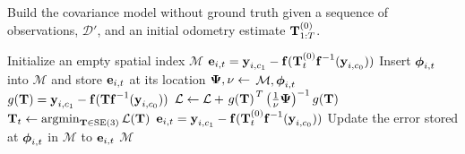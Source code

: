 \begin{algorithm}
  \caption{Build the covariance model without ground truth given a sequence of observations, $\mathcal{D'}$, and an initial odometry estimate $\boldsymbol{\mathbf{T}}_{1:T}^{(0)}$.}
  \label{alg:train-em}
  \begin{algorithmic}
      \State Initialize an empty spatial index $\mathcal{M}$
          \State $\boldsymbol{\mathbf{e}}_{i,t} = \boldsymbol{\mathbf{y}}_{i, c_1} -
          \boldsymbol{\mathbf{f}}( \boldsymbol{\mathbf{T}}_t^{(0)} \boldsymbol{\mathbf{f}}^{-1}(
            \boldsymbol{\mathbf{y}}_{i, c_0} ))$
            \State Insert $\boldsymbol{\mathbf{\phi}}_{i,t}$ into $\mathcal{M}$ and store
              $\boldsymbol{\mathbf{e}}_{i,t}$ at its location
        \EndFor
      \EndFor
      \Repeat
            \State $\boldsymbol{\mathbf{\Psi}}, \nu\gets$  {$\mathcal{M}, \boldsymbol{\mathbf{\phi}}_{i,t}$}
            \State $g(\boldsymbol{\mathbf{T}}) = \boldsymbol{\mathbf{y}}_{i, c_1} -
              \boldsymbol{\mathbf{f}}( \boldsymbol{\mathbf{T}}\boldsymbol{\mathbf{f}}^{-1}(
              \boldsymbol{\mathbf{y}}_{i, c_0} ))$
            \State $\mathcal{L} \gets \mathcal{L} +
              \left.{g(\boldsymbol{\mathbf{T}})}\right.^T
              \left(\frac{1}{\nu}\boldsymbol{\mathbf{\Psi}}\right)^{-1}
              g(\boldsymbol{\mathbf{T}})$
          \EndFor
          \State $\boldsymbol{\mathbf{T}}_t \gets \operatorname*{argmin}_{\boldsymbol{\mathbf{T}}\in\text{SE}(3)}
            \mathcal{L}(\boldsymbol{\mathbf{T}})$
          \State $\boldsymbol{\mathbf{e}}_{i,t} = \boldsymbol{\mathbf{y}}_{i, c_1} -
            \boldsymbol{\mathbf{f}}( \boldsymbol{\mathbf{T}}_t^{(0)} \boldsymbol{\mathbf{f}}^{-1}(
            \boldsymbol{\mathbf{y}}_{i, c_0} ))$
          \State Update the error stored at $\boldsymbol{\mathbf{\phi}}_{i,t}$ in $\mathcal{M}$
            to $\boldsymbol{\mathbf{e}}_{i,t}$
        \EndFor
      \State\Return $\mathcal{M}$
    \EndFunction
  \end{algorithmic}
\end{algorithm}

